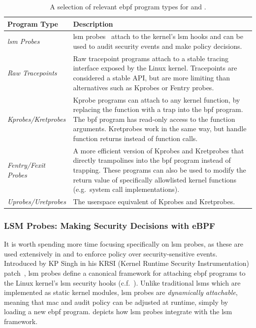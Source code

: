 \begingroup\footnotesize
\begin{longtable}[c]{lp{4.2in}}
\caption[A selection of relevant eBPF program types for \bpfbox{} and \bpfcontain{}]{A selection of relevant \gls{ebpf} program types for \bpfbox{} and \bpfcontain{}.}%
\label{tab:program-types}\\
  \toprule
  Program Type & Description\\
  \midrule
  \textit{\gls{lsm} Probes}    & \gls{lsm} probes~\cite{singh2019_krsi} attach to the kernel's \gls{lsm} hooks and can be used to audit security events and make policy decisions.\\
  \textit{Raw Tracepoints}     & Raw tracepoint programs attach to a stable tracing interface exposed by the Linux kernel. Tracepoints are considered a stable API, but are more limiting than alternatives such as Kprobes or Fentry probes.\\
  \textit{Kprobes/Kretprobes}  & Kprobe programs can attach to any kernel function, by replacing the function with a trap into the \gls{bpf} program. The \gls{bpf} program has read-only access to the function arguments. Kretprobes work in the same way, but handle function returns instead of function calls.\\
  \textit{Fentry/Fexit Probes} & A more efficient version of Kprobes and Kretprobes that directly trampolines into the \gls{bpf} program instead of trapping. These programs can also be used to modify the return value of specifically allowlisted kernel functions (e.g.~system call implementations).\\
  \textit{Uprobes/Uretprobes}  & The userspace equivalent of Kprobes and Kretprobes.\\
  \bottomrule
\end{longtable}
\endgroup

\subsubsection*{LSM Probes: Making Security Decisions with eBPF}

It is worth spending more time focusing specifically on \gls{lsm} probes, as these are used
extensively in \bpfbox{} and \bpfcontain{} to enforce policy over security-sensitive
events. Introduced by KP Singh in his KRSI (Kernel Runtime Security Instrumentation)
patch~\cite{singh2019_krsi}, \gls{lsm} probes define a canonical framework for attaching \gls{ebpf}
programs to the Linux kernel's \gls{lsm} security hooks (c.f.~). Unlike
traditional \gls{lsm}s which are implemented as static kernel modules, \gls{lsm} probes are
\textit{dynamically attachable}, meaning that \gls{mac} and audit policy can be adjusted at
runtime, simply by loading a new \gls{ebpf} program.   depicts how \gls{lsm} probes
integrate with the \gls{lsm} framework.


